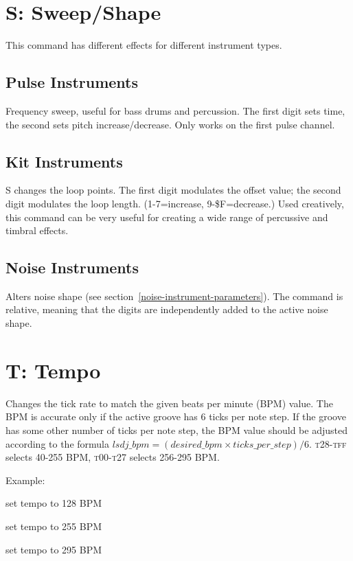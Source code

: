 \section{S: Sweep/Shape}

This command has different effects for different instrument types.

\subsection{Pulse Instruments}

Frequency sweep, useful for bass drums and percussion. The first digit sets time, the second sets pitch increase/decrease. Only works on the first pulse channel.

\subsection{Kit Instruments}

S changes the loop points. The first digit modulates the offset value; the second digit modulates the loop length. (1-7=increase, 9-\$F=decrease.) Used creatively, this command can be very useful for creating a wide range of percussive and timbral effects.

\subsection{Noise Instruments}

Alters noise shape (see section~\ref{noise-instrument-parameters}).
The command is relative, meaning that the digits are independently added to the active noise shape.

\section{T: Tempo}

Changes the tick rate to match the given beats per minute (BPM) value. The BPM is accurate only if the active groove has 6 ticks per note step. If the groove has some other number of ticks per note step, the BPM value should be adjusted according to the formula
\begin{math}
lsdj\_bpm = (desired\_bpm \times ticks\_per\_step)/{6}
\end{math}.
\textsc{t28}-\textsc{tff} selects 40-255 BPM, \textsc{t00}-\textsc{t27} selects 256-295 BPM.

\begin{description}
\item Example:
\item[T80] set tempo to 128 BPM
\item[TFF] set tempo to 255 BPM
\item[T27] set tempo to 295 BPM
\end{description}

